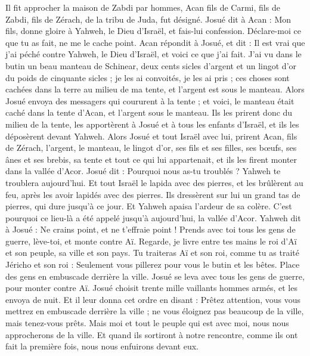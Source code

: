 \begin{multicols}{2}
Il fit approcher la maison de Zabdi par hommes, Acan fils de Carmi, fils de Zabdi, fils de Zérach, de la tribu de Juda, fut désigné.
Josué dit à Acan : Mon fils, donne gloire à Yahweh, le Dieu d’Israël, et fais-lui confession. Déclare-moi ce que tu as fait, ne me le cache point.
Acan répondit à Josué, et dit : Il est vrai que j’ai péché contre Yahweh, le Dieu d’Israël, et voici ce que j’ai fait.
J’ai vu dans le butin un beau manteau de Schinear, deux cents sicles d’argent et un lingot d’or du poids de cinquante sicles ; je les ai convoités, je les ai pris ; ces choses sont cachées dans la terre au milieu de ma tente, et l’argent est sous le manteau.
Alors Josué envoya des messagers qui coururent à la tente ; et voici, le manteau était caché dans la tente d’Acan, et l’argent sous le manteau.
Ils les prirent donc du milieu de la tente, les apportèrent à Josué et à tous les enfants d’Israël, et ils les déposèrent devant Yahweh.
Alors Josué et tout Israël avec lui, prirent Acan, fils de Zérach, l’argent, le manteau, le lingot d’or, ses fils et ses filles, ses bœufs, ses ânes et ses brebis, sa tente et tout ce qui lui appartenait, et ils les firent monter dans la vallée d’Acor.
Josué dit : Pourquoi nous as-tu troublés ? Yahweh te troublera aujourd’hui. Et tout Israël le lapida avec des pierres, et les brûlèrent au feu, après les avoir lapidés avec des pierres.
Ils dressèrent sur lui un grand tas de pierres, qui dure jusqu’à ce jour. Et Yahweh apaisa l’ardeur de sa colère. C’est pourquoi ce lieu-là a été appelé jusqu’à aujourd’hui, la vallée d’Acor.
\VerseOne{}Yahweh dit à Josué : Ne crains point, et ne t’effraie point ! Prends avec toi tous les gens de guerre, lève-toi, et monte contre Aï. Regarde, je livre entre tes mains le roi d’Aï et son peuple, sa ville et son pays.
Tu traiteras Aï et son roi, comme tu as traité Jéricho et son roi : Seulement vous pillerez pour vous le butin et les bêtes. Place des gens en embuscade derrière la ville.
Josué se leva avec tous les gens de guerre, pour monter contre Aï. Josué choisit trente mille vaillants hommes armés, et les envoya de nuit.
Et il leur donna cet ordre en disant : Prêtez attention, vous vous mettrez en embuscade derrière la ville ; ne vous éloignez pas beaucoup de la ville, mais tenez-vous prêts.
Mais moi et tout le peuple qui est avec moi, nous nous approcherons de la ville. Et quand ils sortiront à notre rencontre, comme ils ont fait la première fois, nous nous enfuirons devant eux.

\end{multicols}
